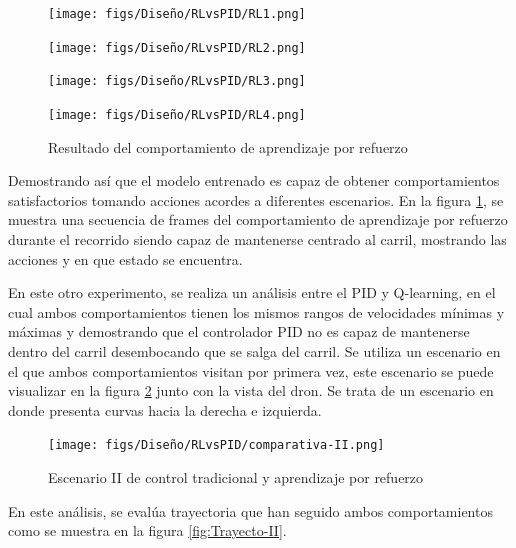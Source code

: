 \begin{figure}[H]
  \centering
  \begin{minipage}{0.3\textwidth}
    \texttt{[image: figs/Diseño/RLvsPID/RL1.png]}
  \end{minipage}
  \hfill
  \begin{minipage}{0.3\textwidth}
    \texttt{[image: figs/Diseño/RLvsPID/RL2.png]}
  \end{minipage}
  \hfill
  \begin{minipage}{0.3\textwidth}
    \texttt{[image: figs/Diseño/RLvsPID/RL3.png]}
  \end{minipage}
  \hfill
  \begin{minipage}{0.3\textwidth}
    \texttt{[image: figs/Diseño/RLvsPID/RL4.png]}
  \end{minipage}
  \caption{Resultado del comportamiento de aprendizaje por refuerzo}
  \label{fig:Resultado-imagenes}
\end{figure}

Demostrando así que el modelo entrenado es capaz de obtener comportamientos satisfactorios tomando acciones acordes a diferentes escenarios. En la figura \ref{fig:Resultado-imagenes}, 
se muestra una secuencia de frames
del comportamiento de aprendizaje por refuerzo durante el recorrido siendo capaz de mantenerse centrado al carril, mostrando las acciones y en que estado se encuentra. \newline

En este otro experimento, se realiza un análisis entre el PID y Q-learning, en el cual ambos comportamientos tienen los mismos rangos de velocidades mínimas y máximas y demostrando que
el controlador PID no es capaz de mantenerse dentro del carril desembocando que se salga 
del carril. Se utiliza un escenario en el que ambos comportamientos visitan por primera vez, este escenario se puede visualizar en la figura \ref{fig:escenario-comparativa-II} junto 
con la vista del dron. Se trata de un escenario en donde presenta curvas hacia la derecha e izquierda.

\begin{figure} [H]
  \begin{center}
    \texttt{[image: figs/Diseño/RLvsPID/comparativa-II.png]}
  \end{center}
  \caption{Escenario II de control tradicional y aprendizaje por refuerzo}
  \label{fig:escenario-comparativa-II}
\end{figure}

En este análisis, se evalúa trayectoria que han seguido ambos comportamientos como se muestra en la figura \ref{fig:Trayecto-II}. 

